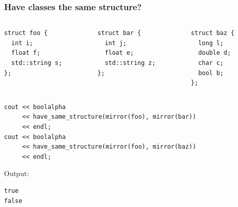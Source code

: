 \documentclass[compress,table,xcolor=table]{beamer}
\begin{document}
\begin{frame}[fragile]
  \frametitle{Have classes the same structure?}
  \begin{columns}
    \begin{column}{.33\textwidth}
      \begin{lstlisting}[language=c++2x,basicstyle=\scriptsize\ttfamily]
struct foo {
  int i;
  float f;
  std::string s;
};
      \end{lstlisting}
    \end{column}
    \begin{column}{.33\textwidth}
      \begin{lstlisting}[language=c++2x,basicstyle=\scriptsize\ttfamily]
struct bar {
  int j;
  float e;
  std::string z;
};
      \end{lstlisting}
    \end{column}
    \begin{column}{.33\textwidth}
      \begin{lstlisting}[language=c++2x,basicstyle=\scriptsize\ttfamily]
struct baz {
  long l;
  double d;
  char c;
  bool b;
};
      \end{lstlisting}
    \end{column}
  \end{columns}
  \begin{lstlisting}[language=c++2x,basicstyle=\scriptsize\ttfamily]
cout << boolalpha
     << have_same_structure(mirror(foo), mirror(bar))
     << endl;
cout << boolalpha
     << have_same_structure(mirror(foo), mirror(baz))
     << endl;
  \end{lstlisting}
  Output:
  \begin{verbatim}
true
false
  \end{verbatim}
\end{frame}
\end{document}

